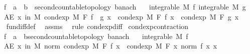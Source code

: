 \begin{isabellebody}
\ \ \ f\ {\isacharcolon}{\kern0pt}{\isacharcolon}{\kern0pt}\ {\isachardoublequoteopen}{\isacharprime}{\kern0pt}a\ {\isasymRightarrow}\ {\isacharprime}{\kern0pt}b\ {\isacharcolon}{\kern0pt}{\isacharcolon}{\kern0pt}\ {\isacharbraceleft}{\kern0pt}second{\isacharunderscore}{\kern0pt}countable{\isacharunderscore}{\kern0pt}topology{\isacharcomma}{\kern0pt}\ banach{\isacharbraceright}{\kern0pt}{\isachardoublequoteclose}\isanewline
\ \ \ {\isachardoublequoteopen}integrable\ M\ f{\isachardoublequoteclose}\ {\isachardoublequoteopen}integrable\ M\ g{\isachardoublequoteclose}\isanewline
\ \ \ {\isachardoublequoteopen}AE\ x\ in\ M{\isachardot}{\kern0pt}\ cond{\isacharunderscore}{\kern0pt}exp\ M\ F\ {\isacharparenleft}{\kern0pt}f\ {\isacharminus}{\kern0pt}\ g{\isacharparenright}{\kern0pt}\ x\ {\isacharequal}{\kern0pt}\ cond{\isacharunderscore}{\kern0pt}exp\ M\ F\ f\ x\ {\isacharminus}{\kern0pt}\ cond{\isacharunderscore}{\kern0pt}exp\ M\ F\ g\ x{\isachardoublequoteclose}\isanewline
%
\isadelimproof
\ \ %
\endisadelimproof
%
\isatagproof
{}\isamarkupfalse%
\ fun{\isacharunderscore}{\kern0pt}diff{\isacharunderscore}{\kern0pt}def\ \isamarkupfalse%
\ assms\ \isamarkupfalse%
\ {\isacharparenleft}{\kern0pt}rule\ cond{\isacharunderscore}{\kern0pt}exp{\isacharunderscore}{\kern0pt}diff{\isacharparenright}{\kern0pt}%
\endisatagproof
{\isafoldproof}%
%
\isadelimproof
\isanewline
%
\endisadelimproof
\isanewline
{}\isamarkupfalse%
\ cond{\isacharunderscore}{\kern0pt}exp{\isacharunderscore}{\kern0pt}contraction{\isacharcolon}{\kern0pt}\isanewline
\ \ \ f\ {\isacharcolon}{\kern0pt}{\isacharcolon}{\kern0pt}\ {\isachardoublequoteopen}{\isacharprime}{\kern0pt}a\ {\isasymRightarrow}\ {\isacharprime}{\kern0pt}b{\isacharcolon}{\kern0pt}{\isacharcolon}{\kern0pt}{\isacharbraceleft}{\kern0pt}second{\isacharunderscore}{\kern0pt}countable{\isacharunderscore}{\kern0pt}topology{\isacharcomma}{\kern0pt}\ banach{\isacharbraceright}{\kern0pt}{\isachardoublequoteclose}\isanewline
\ \ \ {\isachardoublequoteopen}integrable\ M\ f{\isachardoublequoteclose}\isanewline
\ \ \ {\isachardoublequoteopen}AE\ x\ in\ M{\isachardot}{\kern0pt}\ norm\ {\isacharparenleft}{\kern0pt}cond{\isacharunderscore}{\kern0pt}exp\ M\ F\ f\ x{\isacharparenright}{\kern0pt}\ {\isasymle}\ cond{\isacharunderscore}{\kern0pt}exp\ M\ F\ {\isacharparenleft}{\kern0pt}{\isasymlambda}x{\isachardot}{\kern0pt}\ norm\ {\isacharparenleft}{\kern0pt}f\ x{\isacharparenright}{\kern0pt}{\isacharparenright}{\kern0pt}\ x{\isachardoublequoteclose}\ \isanewline

\end{isabellebody}

